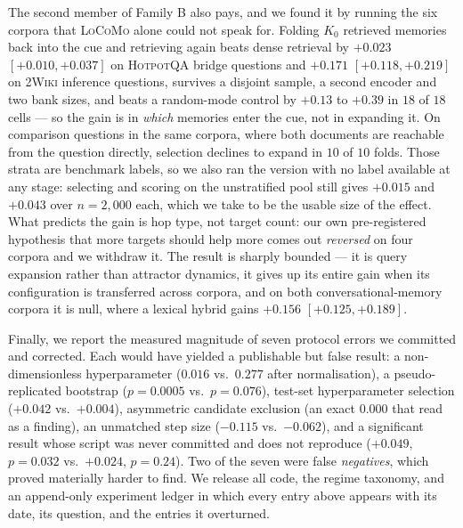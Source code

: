 The second member of Family B also pays, and we found it by running the six corpora that
\textsc{LoCoMo} alone could not speak for. Folding $K_0$ retrieved memories back into the
cue and retrieving again beats dense retrieval by $+0.023$ $[+0.010,+0.037]$ on
\textsc{HotpotQA} bridge questions and $+0.171$ $[+0.118,+0.219]$ on \textsc{2Wiki}
inference questions, survives a disjoint sample, a second encoder and two bank sizes, and
beats a random-mode control by $+0.13$ to $+0.39$ in $18$ of $18$ cells --- so the gain is in
\emph{which} memories enter the cue, not in expanding it. On comparison questions in the
same corpora, where both documents are reachable from the question directly, selection
declines to expand in $10$ of $10$ folds. Those strata are benchmark labels, so we also ran
the version with no label available at any stage: selecting and scoring on the unstratified
pool still gives $+0.015$  and $+0.043$  over
$n{=}2{,}000$ each, which we take to be the usable size of the effect. What predicts the gain is hop type, not target
count: our own pre-registered hypothesis that more targets should help more comes out
\emph{reversed} on four corpora and we withdraw it. The result is sharply bounded --- it is
query expansion rather than attractor dynamics, it gives up its entire gain when its
configuration is transferred across corpora, and on both conversational-memory corpora it is
null, where a lexical hybrid gains $+0.156$ $[+0.125,+0.189]$.

Finally, we report the measured magnitude of seven protocol errors we committed and
corrected. Each would have yielded a publishable but false result: a non-dimensionless
hyperparameter ($0.016$ vs.\ $0.277$ after normalisation), a pseudo-replicated bootstrap
($p{=}0.0005$ vs.\ $p{=}0.076$), test-set hyperparameter selection ($+0.042$ vs.\
$+0.004$), asymmetric candidate exclusion (an exact $0.000$ that read as a finding), an
unmatched step size ($-0.115$ vs.\ $-0.062$), and a significant result whose script was
never committed and does not reproduce ($+0.049$, $p{=}0.032$ vs.\ $+0.024$, $p{=}0.24$).
Two of the seven were false \emph{negatives}, which proved materially harder to find. We release all code, the regime taxonomy, and
an append-only experiment ledger in which every entry above appears with its date, its
question, and the entries it overturned.
